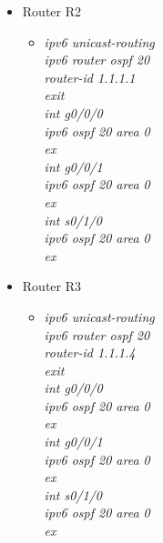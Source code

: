 \documentclass[a4paper, 12pt]{article}
\begin{document}
\begin{itemize}
\begin{itemize}
\begin{itemize}
          \end{itemize}
             \item Router R2
           
        \begin{itemize}
         \item \textit{ipv6 unicast-routing\\
                        ipv6 router ospf 20\\
                        router-id 1.1.1.1\\
                        exit\\
                        int g0/0/0\\
                        ipv6 ospf 20 area 0\\
                        ex\\
                        int g0/0/1\\
                        ipv6 ospf 20 area 0\\
                        ex\\
                        int s0/1/0\\
                        ipv6 ospf 20 area 0\\
                        ex\\}
        
          \end{itemize}
             \item Router R3
           
        \begin{itemize}
         \item \textit{ipv6 unicast-routing\\
                        ipv6 router ospf 20\\
                        router-id 1.1.1.4\\
                        exit\\
                        int g0/0/0\\
                        ipv6 ospf 20 area 0\\
                        ex\\
                        int g0/0/1\\
                        ipv6 ospf 20 area 0\\
                        ex\\
                        int s0/1/0\\
                        ipv6 ospf 20 area 0\\
                        ex\\}
        

\end{itemize}
\end{itemize}
\end{itemize}
\end{document}
